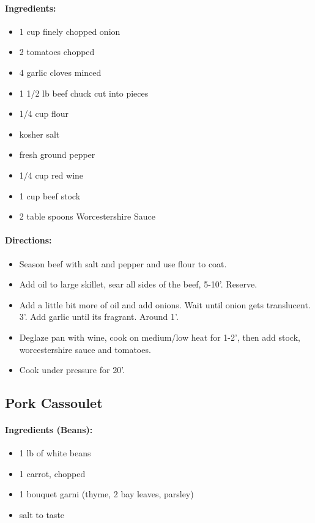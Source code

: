\documentclass{article}
\begin{document}
\paragraph{Ingredients:}
\begin{itemize}
    \item 1 cup finely chopped onion
    \item 2 tomatoes chopped
    \item 4 garlic cloves minced
    \item 1 1/2 lb beef chuck cut into pieces
    \item 1/4 cup flour
    \item kosher salt
    \item fresh ground pepper
    \item 1/4 cup red wine
    \item 1 cup beef stock
    \item 2 table spoons Worcestershire Sauce
\end{itemize}

\paragraph{Directions:}
\begin{itemize}
    \item Season beef with salt and pepper and use flour to coat.
    \item Add oil to large skillet, sear all sides of the beef, 5-10’. Reserve.
    \item Add a little bit more of oil and add onions. Wait until onion gets translucent. 3’. Add garlic until its fragrant. Around 1’.
    \item Deglaze pan with wine, cook on medium/low heat for 1-2’, then add stock, worcestershire sauce and tomatoes.
    \item Cook under pressure for 20’.
\end{itemize}

\subsection{Pork Cassoulet} 

\paragraph{Ingredients (Beans):}
\begin{itemize}
    \item 1 lb of white beans
    \item 1 carrot, chopped
    \item 1 bouquet garni (thyme, 2 bay leaves, parsley)
    \item salt to taste
\end{itemize}  
\end{document}

